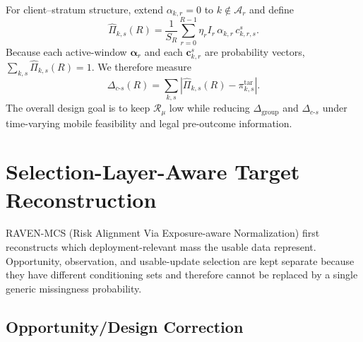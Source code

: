\documentclass[letterpaper,journal]{IEEEtran}
\begin{document}
For client--stratum structure, extend $\alpha_{k,r}=0$ to
$k\notin\mathcal{A}_r$ and define
\begin{equation}
 \widehat\Pi_{k,s}(R)
 =
 \frac{1}{S_R}
 \sum_{r=0}^{R-1}
 \eta_r I_r\,
 \alpha_{k,r}\,
 c^{s}_{k,r,s}.
 \label{eq:Pi_hat_ks}
\end{equation}
Because each active-window $\boldsymbol\alpha_r$ and each
$\mathbf{c}^{s}_{k,r}$ are probability vectors,
$\sum_{k,s}\widehat\Pi_{k,s}(R)=1$.  We therefore measure
\begin{equation}
 \Delta_{c\text{-}s}(R)
 =
 \sum_{k,s}
 \left|
 \widehat\Pi_{k,s}(R)-\pi^{\mathrm{tar}}_{k,s}
 \right|.
 \label{eq:delta_cs}
\end{equation}
The overall design goal is to keep $\mathcal{R}_{\mu}$ low while
reducing $\Delta_{\mathrm{group}}$ and $\Delta_{c\text{-}s}$ under
time-varying mobile feasibility and legal pre-outcome information.


\section{Selection-Layer-Aware Target Reconstruction}
\label{sec:reconstruction}

RAVEN-MCS (Risk Alignment Via Exposure-aware Normalization) first reconstructs
which deployment-relevant mass the usable data represent.  Opportunity,
observation, and usable-update selection are kept separate because they have
different conditioning sets and therefore cannot be replaced by a single
generic missingness probability.

\subsection{Opportunity/Design Correction}
\label{subsec:design_correction}
\end{document}
